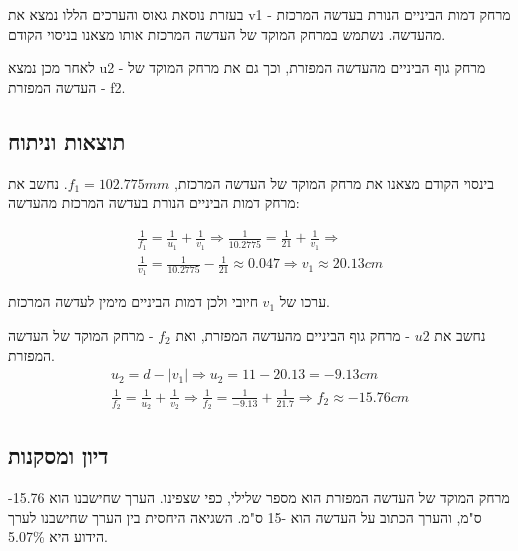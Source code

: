 \documentclass[14pt]{extarticle}
\begin{document}
בעזרת נוסאת גאוס והערכים הללו נמצא את v1 - מרחק דמות הביניים הנורת בעדשה המרכזת מהעדשה. נשתמש במרחק המוקד של  העדשה המרכזת  אותו מצאנו בניסוי הקודם.

לאחר מכן נמצא u2 - מרחק גוף  הביניים מהעדשה המפזרת, וכך גם את מרחק המוקד של העדשה המפזרת - f2.

\subsection*{תוצאות וניתוח}
בינסוי הקודם מצאנו את מרחק המוקד של העדשה המרכזת, $f_1 = 102.775 mm$.
נחשב את מרחק דמות הביניים הנורת בעדשה המרכזת מהעדשה:

\begin{equation}
\begin{aligned}
\frac{1}{f_1} = \frac{1}{u_1} + \frac{1}{v_1}
\Rightarrow
\frac{1}{10.2775} = \frac{1}{21} + \frac{1}{v_1}
\Rightarrow
\\
\frac{1}{v_1} = \frac{1}{10.2775} - \frac{1}{21} \approx 0.047
\Rightarrow
v_1 \approx 20.13 cm
\end{aligned}
\end{equation}

ערכו של $v_1$ חיובי ולכן דמות הביניים מימין לעדשה המרכזת.

נחשב את $u2$ - מרחק גוף הביניים מהעדשה המפזרת, ואת $f_2$ - מרחק המוקד של העדשה המפזרת.
\begin{equation}
\begin{aligned}
u_2 = d - |v_1|
\Rightarrow
u_2 = 11 - 20.13 = -9.13 cm
\\
\frac{1}{f_2} = \frac{1}{u_2} + \frac{1}{v_2}
\Rightarrow
\frac{1}{f_2} = \frac{1}{-9.13} + \frac{1}{21.7}
\Rightarrow
f_2 \approx -15.76 cm
\end{aligned}
\end{equation}

\subsection*{דיון ומסקנות}
מרחק המוקד של העדשה המפזרת הוא מספר שלילי, כפי שצפינו.
הערך שחישבנו הוא 15.76- ס"מ, והערך הכתוב  על העדשה הוא -15 ס"מ.
השגיאה היחסית בין הערך שחישבנו לערך הידוע היא 5.07\%.
\end{document}
